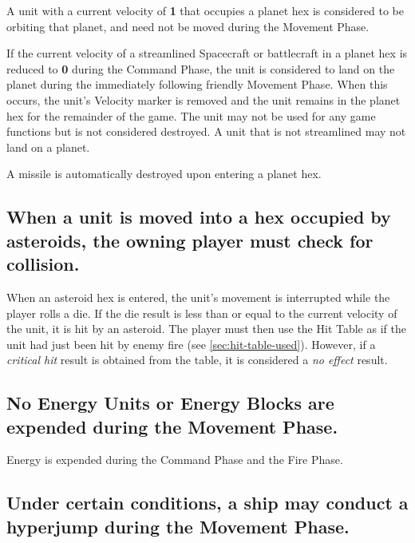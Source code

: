 A unit with a current velocity of \textbf{1} that occupies a planet
hex is considered to be orbiting that planet, and need not be moved
during the Movement Phase.

If the current velocity of a streamlined Spacecraft or battlecraft in
a planet hex is reduced to \textbf{0} during the Command Phase, the
unit is considered to land on the planet during the immediately
following friendly Movement Phase. When this occurs, the unit's
Velocity marker is removed and the unit remains in the planet hex for
the remainder of the game. The unit may not be used for any game
functions but is not considered destroyed. A unit that is not
streamlined may not land on a planet.

A missile is automatically destroyed upon entering a planet hex. 


\subsection[Asteroids]{When a unit is moved into a hex occupied by
  asteroids, the 
  owning player must check for collision.}
\label{sec:asteroid-collision}



When an asteroid hex is entered, the unit's movement is interrupted
while the player rolls a die. If the die result is less than or equal
to the current velocity of the unit, it is hit by an asteroid. The
player must then use the Hit Table as if the unit had just been hit by
enemy fire (see \ref{sec:hit-table-used}). However, if a \emph{critical hit}
result is obtained from the table, it is considered a \emph{no effect}
result.


\subsection[Energy In Movement Phase]{No Energy Units or Energy Blocks
  are expended during the 
  Movement Phase.}
\label{sec:energy-movement}



Energy is expended during the Command Phase and the Fire Phase. 


\subsection[Hyperjump]{Under certain conditions, a ship may conduct a
  hyperjump 
  during the Movement Phase.}
\label{sec:hyperjump}



